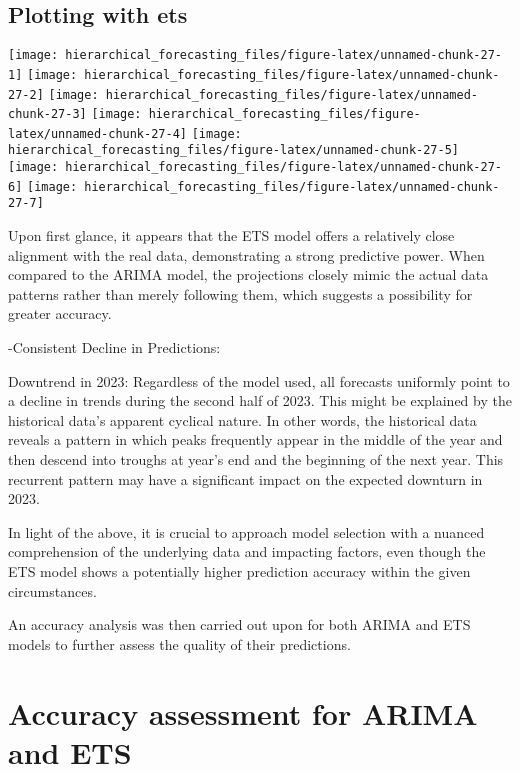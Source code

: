 \documentclass[
]{article}
\begin{document}
\hypertarget{plotting-with-ets-1}{%
\subsection{Plotting with ets}\label{plotting-with-ets-1}}

\texttt{[image: hierarchical\_forecasting\_files/figure-latex/unnamed-chunk-27-1]}
\texttt{[image: hierarchical\_forecasting\_files/figure-latex/unnamed-chunk-27-2]}
\texttt{[image: hierarchical\_forecasting\_files/figure-latex/unnamed-chunk-27-3]}
\texttt{[image: hierarchical\_forecasting\_files/figure-latex/unnamed-chunk-27-4]}
\texttt{[image: hierarchical\_forecasting\_files/figure-latex/unnamed-chunk-27-5]}
\texttt{[image: hierarchical\_forecasting\_files/figure-latex/unnamed-chunk-27-6]}
\texttt{[image: hierarchical\_forecasting\_files/figure-latex/unnamed-chunk-27-7]}

Upon first glance, it appears that the ETS model offers a relatively close alignment with the real data, demonstrating a strong predictive power. When compared to the ARIMA model, the projections closely mimic the actual data patterns rather than merely following them, which suggests a possibility for greater accuracy.

-Consistent Decline in Predictions:

Downtrend in 2023: Regardless of the model used, all forecasts uniformly point to a decline in trends during the second half of 2023. This might be explained by the historical data's apparent cyclical nature. In other words, the historical data reveals a pattern in which peaks frequently appear in the middle of the year and then descend into troughs at year's end and the beginning of the next year. This recurrent pattern may have a significant impact on the expected downturn in 2023.

In light of the above, it is crucial to approach model selection with a nuanced comprehension of the underlying data and impacting factors, even though the ETS model shows a potentially higher prediction accuracy within the given circumstances.

An accuracy analysis was then carried out upon for both ARIMA and ETS models to further assess the quality of their predictions.

\hypertarget{accuracy-assessment-for-arima-and-ets}{%
\section{Accuracy assessment for ARIMA and ETS}\label{accuracy-assessment-for-arima-and-ets}}
\end{document}
